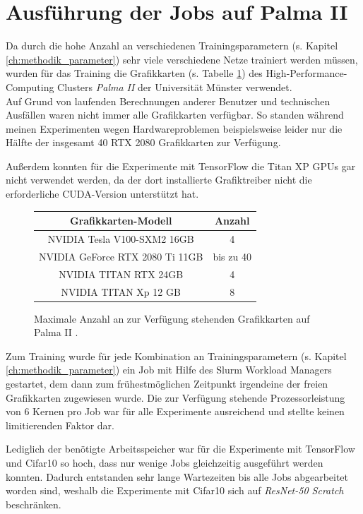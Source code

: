 \section{Ausführung der Jobs auf Palma II}
\label{ch:methodik_palma}
Da durch die hohe Anzahl an verschiedenen Trainingsparametern (s. Kapitel \ref{ch:methodik_parameter}) sehr viele verschiedene Netze trainiert werden müssen, wurden für das Training die Grafikkarten (s. Tabelle \ref{tab:palmaGPUs}) des High-Performance-Computing Clusters \textit{Palma II} der Universität Münster \cite{palma2} verwendet.\\
Auf Grund von laufenden Berechnungen anderer Benutzer und technischen Ausfällen waren nicht immer alle Grafikkarten verfügbar. So standen während meinen Experimenten wegen Hardwareproblemen beispielsweise leider nur die Hälfte der insgesamt 40 RTX 2080 Grafikkarten zur Verfügung.

Außerdem konnten für die Experimente mit TensorFlow \cite{tensorflow} die Titan XP GPUs gar nicht verwendet werden, da der dort installierte Grafiktreiber nicht die erforderliche CUDA-Version unterstützt hat.

\begin{figure}[H]
\begin{tabular}{|c|c|}
\hline 
Grafikkarten-Modell & Anzahl \\ 
\hline 
NVIDIA Tesla V100-SXM2 16GB & 4 \\ 
\hline 
NVIDIA GeForce RTX 2080 Ti 11GB & bis zu 40\\
\hline
NVIDIA TITAN RTX 24GB & 4\\
\hline
NVIDIA TITAN Xp 12 GB & 8\\
\hline
\end{tabular} 
\caption{Maximale Anzahl an zur Verfügung stehenden Grafikkarten auf Palma II \cite{palma2}.}
\label{tab:palmaGPUs}
\end{figure}

Zum Training wurde für jede Kombination an Trainingsparametern (s. Kapitel \ref{ch:methodik_parameter}) ein Job mit Hilfe des Slurm Workload Managers \cite{slurm} gestartet, dem dann zum frühestmöglichen Zeitpunkt irgendeine der freien Grafikkarten zugewiesen wurde. Die zur Verfügung stehende Prozessorleistung von 6 Kernen pro Job war für alle Experimente ausreichend und stellte keinen limitierenden Faktor dar.

Lediglich der benötigte Arbeitsspeicher war für die Experimente mit TensorFlow \cite{tensorflow} und Cifar10 \cite{cifar10} so hoch, dass nur wenige Jobs gleichzeitig ausgeführt werden konnten. Dadurch entstanden sehr lange Wartezeiten bis alle Jobs abgearbeitet worden sind, weshalb die Experimente mit Cifar10 \cite{cifar10} sich auf \textit{ResNet-50 Scratch} beschränken.

